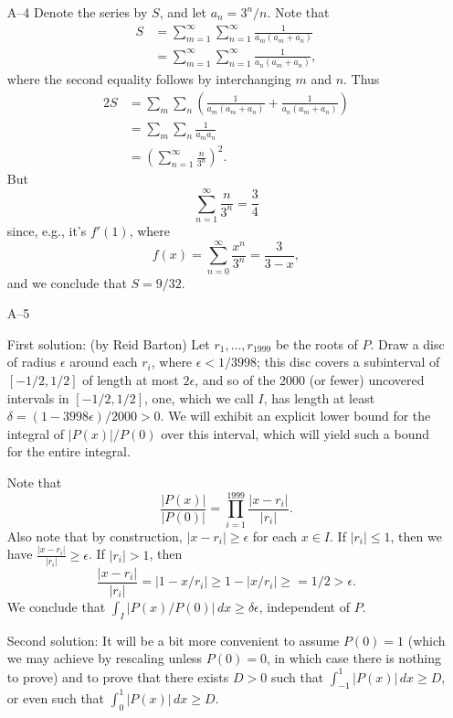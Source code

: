 \documentclass[amssymb,twocolumn,pra,10pt,aps]{revtex4-1}
\begin{document}
\begin{itemize}
\item[A--4]
Denote the series by $S$, and let $a_n = 3^n/n$.  Note that
\begin{align*}
S &= \sum_{m=1}^\infty \sum_{n=1}^\infty \frac{1}
{a_m(a_m+a_n)} \\
&= \sum_{m=1}^\infty \sum_{n=1}^\infty \frac{1}{a_n(a_m+a_n)},
\end{align*}
where the second equality follows by interchanging $m$ and $n$.
Thus
\begin{align*}
2S &= \sum_m \sum_n \left( \frac{1}{a_m(a_m+a_n)} +
\frac{1}{a_n(a_m+a_n)}\right) \\
&= \sum_m \sum_n \frac{1}{a_m a_n} \\
&= \left( \sum_{n=1}^\infty \frac{n}{3^n} \right)^2.
\end{align*}
But
\[
\sum_{n=1}^\infty \frac{n}{3^n} = \frac34
\]
since, e.g., it's $f'(1)$,
where
\[
f(x) = \sum_{n=0}^\infty \frac{x^n}{3^n} = \frac{3}{3-x},
\]
and we conclude that $S = 9/32$.

\item[A--5]

First solution: (by Reid Barton)
Let $r_1, \dots, r_{1999}$ be the roots of $P$. Draw a disc of radius
$\epsilon$ around each $r_i$, where $\epsilon < 1/3998$; this
disc covers a subinterval of $[-1/2,1/2]$
of length at most $2\epsilon$, and so of the 2000 (or fewer) uncovered
intervals in $[-1/2,1/2]$,
one, which we call $I$, has length at least $\delta = (1-3998\epsilon)/2000
> 0$.
We will exhibit an explicit lower bound for the integral of $|P(x)|/P(0)$ over this
interval, which will yield such a bound for the entire integral.

Note that
\[
\frac{|P(x)|}{|P(0)|} = \prod_{i=1}^{1999} \frac{|x-r_i|}{|r_i|}.
\]
Also note that by construction, $|x - r_i| \geq \epsilon$ for each $x \in I$.
If $|r_i| \leq 1$, then we have $\frac{|x-r_i|}{|r_i|} \geq \epsilon$. If $|r_i| > 1$, then
\[
\frac{|x-r_i|}{|r_i|} = |1 - x/r_i| \geq 1 - |x/r_i| \geq = 1/2
> \epsilon.
\]
We conclude that $\int_I |P(x)/P(0)|\,dx \geq \delta \epsilon$,
independent of $P$.

Second solution:
It will be a bit more convenient to assume $P(0) = 1$ (which we
may achieve by rescaling unless $P(0)=0$, in which case
there is nothing to prove) and to prove that there exists $D>0$
such that $\int_{-1}^1 |P(x)|\,dx \geq D$, or even
such that $\int_0^1 |P(x)|\,dx \geq D$.


\end{itemize}
\end{document}
